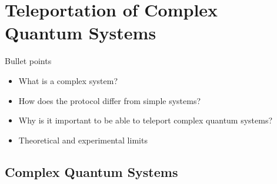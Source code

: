 \section{Teleportation of Complex Quantum Systems}
\begin{mybox}{Bullet points}
    \begin{itemize}
        \item What is a complex system?
        \item How does the protocol differ from simple systems?
        \item Why is it important to be able to teleport complex quantum systems?
        \item Theoretical and experimental limits
    \end{itemize}
\end{mybox}

\subsection{Complex Quantum Systems}